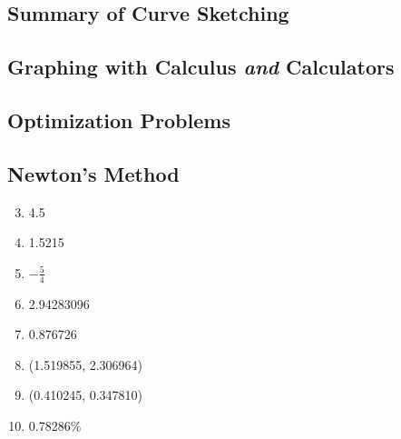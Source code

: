 \documentclass{article}
\begin{document}
\subsection{Summary of Curve Sketching}
\subsection{Graphing with Calculus \textit{and} Calculators}
\subsection{Optimization Problems}
\subsection{Newton's Method}
\begin{enumerate}
    \setcounter{enumi}{2}
  \item 4.5
    \setcounter{enumi}{6}
  \item 1.5215
    \setcounter{enumi}{8}
  \item $-\frac{5}{4}$
    \setcounter{enumi}{10}
  \item 2.94283096
    \setcounter{enumi}{14}
  \item 0.876726
    \setcounter{enumi}{35}
  \item (1.519855, 2.306964)
    \setcounter{enumi}{36}
  \item (0.410245, 0.347810)
    \setcounter{enumi}{38}
  \item 0.78286\%
\end{enumerate}
\end{document}
